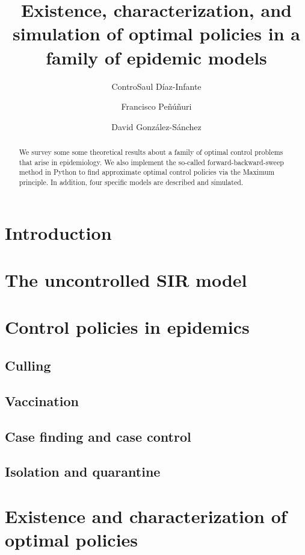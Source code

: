 \documentclass[]{amsart}
\title[%
Optimal policies in a family of epidemic 
	models%
	]{
	Existence, characterization, and simulation of optimal policies in a family of epidemic 
  models
}
\author[S. D\'iaz-Infante]{ControSaul D\'iaz-Infante}
\author[F. Pe\~n\'{u}\~nuri]{Francisco Pe\~n\'u\~nuri}
\author[D. Gonz\'alez-S\'anchez]{David Gonz\'alez-S\'anchez}
\begin{document}
\maketitle	
  \begin{abstract}
  	We survey some some theoretical results about a family of optimal control problems that arise in 
  	epidemiology. We also implement the so-called forward-backward-sweep method in Python to find 
  	approximate optimal control policies via the Maximum principle. In addition, four specific models 
  	are described and simulated.  
  \end{abstract}
%
  \section{Introduction}
    
  \section{The uncontrolled SIR model}
    
  \section{Control policies in epidemics}
    
    \subsection{Culling}
      
    \subsection{Vaccination}
      
    \subsection{Case finding and case control}
      
    \subsection{Isolation and quarantine}
      
%
  \section{Existence and characterization of optimal policies}
    
%
%
\end{document}
